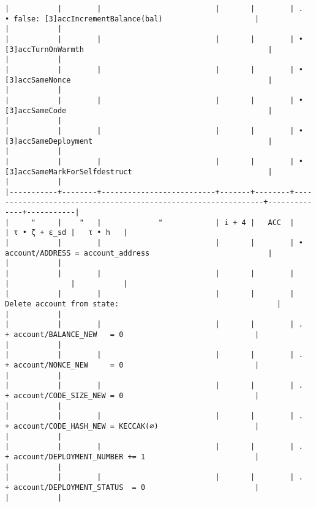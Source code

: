 \documentclass[varwidth=\maxdimen,margin=0.5cm,multi={verbatim}]{standalone}
\begin{document}
\begin{verbatim}
|           |        |                          |       |        | .    • false: [3]accIncrementBalance(bal)                     |              |           |
|           |        |                          |       |        | • [3]accTurnOnWarmth                                          |              |           |
|           |        |                          |       |        | • [3]accSameNonce                                             |              |           |
|           |        |                          |       |        | • [3]accSameCode                                              |              |           |
|           |        |                          |       |        | • [3]accSameDeployment                                        |              |           |
|           |        |                          |       |        | • [3]accSameMarkForSelfdestruct                               |              |           |
|-----------+--------+--------------------------+-------+--------+---------------------------------------------------------------+--------------+-----------|
|     "     |    "   |             "            | i + 4 |   ACC  |                                                               | τ • ζ + ε_sd |   τ • h   |
|           |        |                          |       |        | • account/ADDRESS = account_address                           |              |           |
|           |        |                          |       |        |                                                               |              |           |
|           |        |                          |       |        | Delete account from state:                                    |              |           |
|           |        |                          |       |        | .    + account/BALANCE_NEW   = 0                              |              |           |
|           |        |                          |       |        | .    + account/NONCE_NEW     = 0                              |              |           |
|           |        |                          |       |        | .    + account/CODE_SIZE_NEW = 0                              |              |           |
|           |        |                          |       |        | .    + account/CODE_HASH_NEW = KECCAK(∅)                      |              |           |
|           |        |                          |       |        | .    + account/DEPLOYMENT_NUMBER += 1                         |              |           |
|           |        |                          |       |        | .    + account/DEPLOYMENT_STATUS  = 0                         |              |           |

\end{verbatim}
\end{document}
